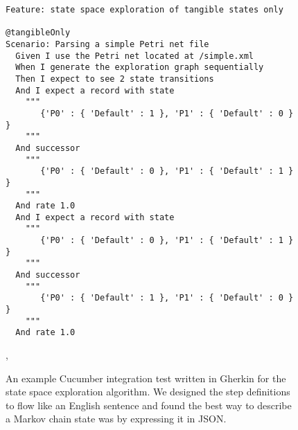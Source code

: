 \begin{figure}
\begin{lstlisting}[language=Cucumber,
                   frame=single, 
                  ]
Feature: state space exploration of tangible states only

@tangibleOnly
Scenario: Parsing a simple Petri net file
  Given I use the Petri net located at /simple.xml
  When I generate the exploration graph sequentially
  Then I expect to see 2 state transitions
  And I expect a record with state
    """
       {'P0' : { 'Default' : 1 }, 'P1' : { 'Default' : 0 } }
    """
  And successor
    """
       {'P0' : { 'Default' : 0 }, 'P1' : { 'Default' : 1 } }
    """
  And rate 1.0
  And I expect a record with state
    """
       {'P0' : { 'Default' : 0 }, 'P1' : { 'Default' : 1 } }
    """
  And successor
    """
       {'P0' : { 'Default' : 1 }, 'P1' : { 'Default' : 0 } }
    """
  And rate 1.0

\end{lstlisting}
\caption{An example Cucumber integration test written in Gherkin for the state space exploration algorithm. We designed the step definitions to flow like an English sentence and found the best way to describe a Markov chain state was by expressing it in JSON.}, 
\label{lst:cucumber_state_space}
\end{figure}